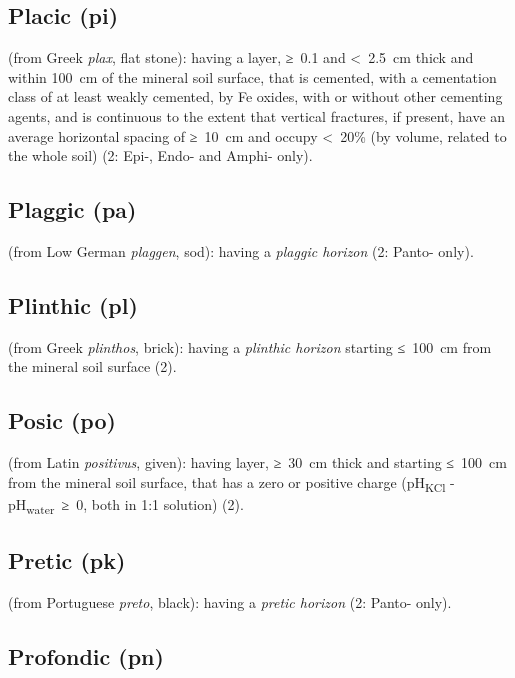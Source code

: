 \documentclass[
  letterpaper,
  DIV=11,
  numbers=noendperiod]{scrreprt}
\begin{document}
\hypertarget{placic-pi}{%
\subsection{Placic (pi)}\label{placic-pi}}

(from Greek \emph{plax}, flat stone): having a layer, ≥~0.1 and
\textless~2.5~cm thick and within 100~cm of the mineral soil surface,
that is cemented, with a cementation class of at least weakly cemented,
by Fe oxides, with or without other cementing agents, and is continuous
to the extent that vertical fractures, if present, have an average
horizontal spacing of ≥~10~cm and occupy \textless~20\% (by volume,
related to the whole soil) (2: Epi-, Endo- and Amphi- only).

\hypertarget{plaggic-pa}{%
\subsection{Plaggic (pa)}\label{plaggic-pa}}

(from Low German \emph{plaggen}, sod): having a \emph{plaggic horizon}
(2: Panto- only).

\hypertarget{plinthic-pl}{%
\subsection{Plinthic (pl)}\label{plinthic-pl}}

(from Greek \emph{plinthos}, brick): having a \emph{plinthic horizon}
starting ≤~100~cm from the mineral soil surface (2).

\hypertarget{posic-po}{%
\subsection{Posic (po)}\label{posic-po}}

(from Latin \emph{positivus}, given): having layer, ≥~30~cm thick and
starting ≤~100~cm from the mineral soil surface, that has a zero or
positive charge (pH\textsubscript{KCl} - pH\textsubscript{water}~≥~0,
both in 1:1 solution) (2).

\hypertarget{pretic-pk}{%
\subsection{Pretic (pk)}\label{pretic-pk}}

(from Portuguese \emph{preto}, black): having a \emph{pretic horizon}
(2: Panto- only).

\hypertarget{profondic-pn}{%
\subsection{Profondic (pn)}\label{profondic-pn}}
\end{document}
